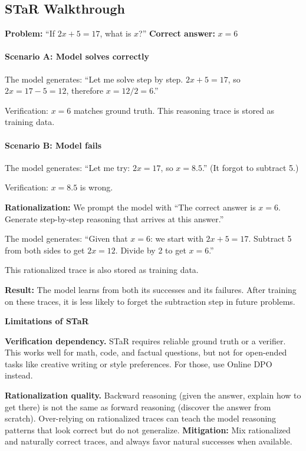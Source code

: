 \begin{chapterenv}
\subsection{STaR Walkthrough}

\textbf{Problem:} ``If $2x + 5 = 17$, what is $x$?'' \quad \textbf{Correct answer:} $x = 6$

\paragraph{Scenario A: Model solves correctly}

The model generates: ``Let me solve step by step. $2x + 5 = 17$, so $2x = 17 - 5 = 12$, therefore $x = 12 / 2 = 6$.''

Verification: $x = 6$ matches ground truth. This reasoning trace is stored as training data.

\paragraph{Scenario B: Model fails}

The model generates: ``Let me try: $2x = 17$, so $x = 8.5$.'' (It forgot to subtract 5.)

Verification: $x = 8.5$ is wrong.

\textbf{Rationalization:} We prompt the model with ``The correct answer is $x = 6$. Generate step-by-step reasoning that arrives at this answer.''

The model generates: ``Given that $x = 6$: we start with $2x + 5 = 17$. Subtract 5 from both sides to get $2x = 12$. Divide by 2 to get $x = 6$.''

This rationalized trace is also stored as training data.

\textbf{Result:} The model learns from both its successes and its failures. After training on these traces, it is less likely to forget the subtraction step in future problems.

\begin{tipbox}
\textbf{Limitations of STaR}

\textbf{Verification dependency.} STaR requires reliable ground truth or a verifier. This works well for math, code, and factual questions, but not for open-ended tasks like creative writing or style preferences. For those, use Online DPO instead.

\textbf{Rationalization quality.} Backward reasoning (given the answer, explain how to get there) is not the same as forward reasoning (discover the answer from scratch). Over-relying on rationalized traces can teach the model reasoning patterns that look correct but do not generalize. \textbf{Mitigation:} Mix rationalized and naturally correct traces, and always favor natural successes when available.


\end{tipbox}
\end{chapterenv}
